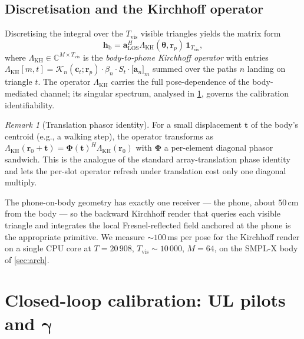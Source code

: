 \documentclass[journal,twocolumn,10pt]{IEEEtran}
\theoremstyle{plain}
\theoremstyle{definition}
\theoremstyle{remark}
\newtheorem{remark}[theorem]{Remark}
\newcommand{\rr}{\mathbf{r}}
\newcommand{\Phimat}{\mathbf{\Phi}}
\newcommand{\thetab}{\bm{\theta}}
\newcommand{\gammab}{\bm{\gamma}}
\newcommand{\hbody}{\bm{h}_{\mathrm{b}}}
\newcommand{\Complex}{\mathbb{C}}
\begin{document}
\subsection{Discretisation and the Kirchhoff operator}

Discretising the integral over the $T_{\mathrm{vis}}$ visible
triangles yields the matrix form
\begin{equation}\label{eq:Lambda-op}
\hbody = \mathbf{a}_{\mathrm{LOS}}^{H}\Lambda_{\mathrm{KH}}(\thetab,\rr_p)\,
\bm{1}_{T_{\mathrm{vis}}},
\end{equation}
where $\Lambda_{\mathrm{KH}} \in \Complex^{M \times T_{\mathrm{vis}}}$
is the \emph{body-to-phone Kirchhoff operator} with entries
$\Lambda_{\mathrm{KH}}[m,t] = \mathcal{K}_n(\bm{c}_t;\rr_p) \cdot
\beta_n \cdot S_t \cdot \bigl[\bm{a}_n\bigr]_m$ summed over the
paths $n$ landing on triangle $t$. The operator $\Lambda_{\mathrm{KH}}$
carries the full pose-dependence of the body-mediated channel; its
singular spectrum, analysed in \cref{sec:closed-loop}, governs the
calibration identifiability.

\begin{remark}[Translation phasor identity]
For a small displacement $\bm{t}$ of the body's centroid (e.g., a
walking step), the operator transforms as $\Lambda_{\mathrm{KH}}(\rr_0
+ \bm{t}) = \Phimat(\bm{t})^{H}\Lambda_{\mathrm{KH}}(\rr_0)$ with
$\Phimat$ a per-element diagonal phasor sandwich. This is the
analogue of the standard
array-translation phase identity and lets the per-slot operator
refresh under translation cost only one diagonal multiply.
\end{remark}

The phone-on-body geometry has exactly one receiver --- the phone,
about $50\,$cm from the body --- so the backward Kirchhoff render
that queries each visible triangle and integrates the local
Fresnel-reflected field anchored at the phone is the appropriate
primitive. We measure $\sim\!100\,$ms per pose for the Kirchhoff
render on a single CPU core at $T = 20\,908$, $T_{\mathrm{vis}}
\sim 10\,000$, $M = 64$, on the SMPL-X body of \cref{sec:arch}.


\section{Closed-loop calibration: UL pilots and \texorpdfstring{$\gammab$}{gamma}}\label{sec:closed-loop}
\end{document}

